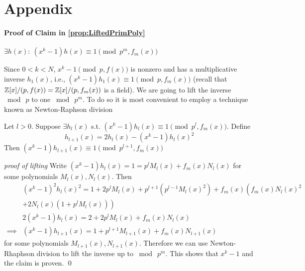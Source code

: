 \clearpage\section*{Appendix}
\paragraph{\bf Proof of Claim in \cref{prop:LiftedPrimPoly}}
\(\exists h(x):\: (x^k - 1)h(x) \equiv 1 \pmod{p^m, f_m(x)}\)
\begin{ext_proof}\label{proof:LiftedPrimPoly}
    Since \(0 < k < N\), \(x^k - 1 \pmod{p, f(x)}\) is nonzero and has a multiplicative inverse \(h_1(x)\), i.e., \((x^k - 1)h_1(x) \equiv 1 \pmod{p, f_m(x)}\) (recall that \(\mathbb{Z}[x]/(p, f(x)) = \mathbb{Z}[x]/(p, f_m(x))\) is a field). We are going to lift the inverse \(\bmod \  p\) to one \(\bmod \  p^m\). To do so it is most convenient to employ a technique known as Newton-Raphson division~\cite{MISC:WikiNewton}

    \smallskip
    Let \(l > 0\). Suppose \(\exists h_l(x)\) s.t. \((x^k - 1)h_l(x) \equiv 1 \pmod{p^l, f_m(x)}\). Define
    \[h_{l+1}(x) = 2 h_l(x) - (x^k - 1)h_l(x)^2\]
    Then \((x^k - 1)h_{l+1}(x) \equiv 1 \pmod{p^{l+1}, f_m(x)}\)

    \noindent\emph{proof of lifting} \quad Write \((x^k - 1)h_l(x) = 1 = p^l M_l(x) + f_m(x) N_l(x)\) for some polynomials \(M_l(x), N_l(x)\). Then
    \begin{align*}
        &(x^k - 1)^2h_l(x)^2 = 1 + 2p^l M_l(x) + p^{l+1}(p^{l-1}M_l(x)^2) + f_m(x)\left(f_m(x) N_l(x)^2  \right.\\
        &\left. + 2 N_l(x) (1 + p^l M_l(x)) \right) \\
        &2(x^k - 1)h_l(x) = 2 + 2p^l M_l(x) + f_m(x) N_l(x) \\
        \implies &(x^k - 1)h_{l+1}(x) = 1 + p^{l+1} M_{l+1}(x) + f_m(x) N_{l+1}(x)
    \end{align*}
    for some polynomials \(M_{l+1}(x), N_{l+1}(x)\). Therefore we can use Newton-Rhaphson division to lift the inverse up to \(\bmod \  p^m\). This shows that \(x^k - 1\) and the claim is proven. \hfill \qed
\end{ext_proof}

